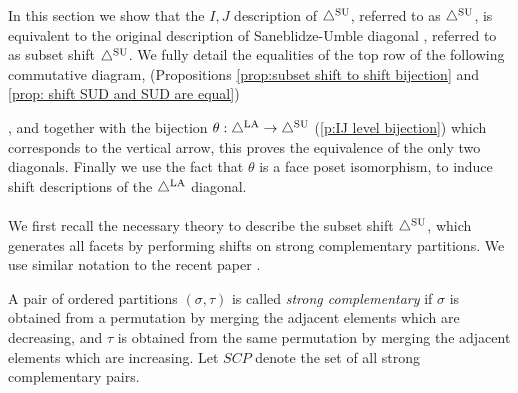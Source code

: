 
In this section we show that the $I,J$ description of $\triangle^{\mathrm{SU}}$, referred to as $\triangle^{\mathrm{SU}}$, is equivalent to the original description of Saneblidze-Umble diagonal \cite{SaneblidzeUmble04}, referred to as subset shift $\triangle^{\mathrm{SU}}$.
We fully detail the equalities of the top row of the following commutative diagram, (Propositions \ref{prop:subset shift to shift bijection} and \ref{prop: shift SUD and SUD are equal})
\begin{center}
\end{center}
, and together with the bijection $\theta:\triangle^{\mathrm{LA}} \to \triangle^{\mathrm{SU}}$ (\cref{p:IJ level bijection}) which corresponds to the vertical arrow, this proves the equivalence of the only two diagonals.
Finally we use the fact that $\theta$ is a face poset isomorphism, to induce shift descriptions of the $\triangle^{\mathrm{LA}}$ diagonal.
\\\\
We first recall the necessary theory to describe the subset shift $\triangle^{\mathrm{SU}}$, which generates all facets by performing shifts on strong complementary partitions.
We use similar notation to the recent paper \cite{saneblidzeComparingDiagonalsAssociahedra2022}.
\begin{definition}
A pair of ordered partitions $(\sigma,\tau)$ is called \emph{strong complementary} if $\sigma$ is obtained from a permutation by merging the adjacent elements which are decreasing, and $\tau$ is obtained from the same permutation by merging the adjacent elements which are increasing.
Let $SCP$ denote the set of all strong complementary pairs.
\end{definition}

